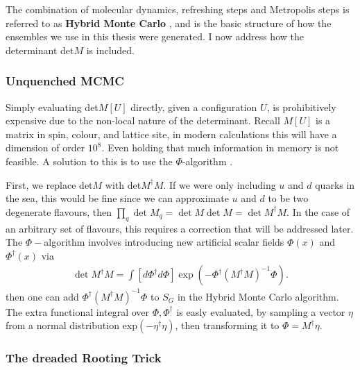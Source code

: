 The combination of molecular dynamics, refreshing steps and Metropolis steps is referred to as {\bf{Hybrid Monte Carlo}} \cite{DUANE1987216}, and is the basic structure of how the ensembles we use in this thesis were generated. I now address how the determinant det$M$ is included.

\subsubsection{Unquenched MCMC}

Simply evaluating det$M[U]$ directly, given a configuration $U$, is prohibitively expensive due to the non-local nature of the determinant. Recall $M[U]$ is a matrix in spin, colour, and lattice site, in modern calculations this will have a dimension of order $10^8$. Even holding that much information in memory is not feasible. A solution to this is to use the $\Phi$-algorithm \cite{PhysRevD.35.2531}.

First, we replace det$M$ with det$M^{\dagger}M$. If we were only including $u$ and $d$ quarks in the sea, this would be fine since we can approximate $u$ and $d$ to be two degenerate flavours, then $\prod_q \det M_q = \det M \det M = \det M^{\dagger} M$. In the case of an arbitrary set of flavours, this requires a correction that will be addressed later.
The $\Phi-$algorithm involves introducing new artificial scalar fields $\Phi(x)$ and $\Phi^{\dagger}(x)$ via
\begin{align}
  \det M^{\dagger} M = \int [d\Phi^{\dagger}d\Phi] \exp(-\Phi^{\dagger} (M^{\dagger}M)^{-1}\Phi).
\end{align}
then one can add $\Phi^{\dagger} (M^{\dagger}M)^{-1}\Phi$ to $S_G$ in the Hybrid Monte Carlo algorithm. The extra functional integral over $\Phi,\Phi^{\dagger}$ is easly evaluated, by sampling a vector $\eta$ from a normal distribution exp$(-\eta^{\dagger}\eta)$, then transforming it to $\Phi = M^{\dagger} \eta$.

\subsubsection{The dreaded Rooting Trick}

